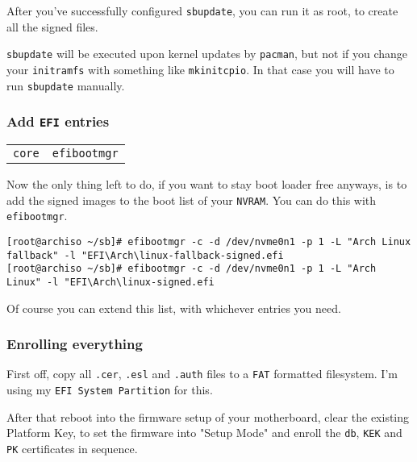 \documentclass[9pt]{report}
\newenvironment{NOTE}
{\begin{tcolorbox}[colback=admonitionBG,coltitle=draculaFG,colframe=draculaBlue,colbacktitle=draculaBlue,title=NOTE]}
{\end{tcolorbox}}
\newenvironment{packagetable}
{\begin{longtabu}to \textwidth [b]{X[1,r]|X[1,l]}}
{\end{longtabu}}
\begin{document}
After you’ve successfully configured \texttt{sbupdate}, you can run it as root, to create all the signed files.


\begin{NOTE}
    \texttt{sbupdate} will be executed upon kernel updates by \texttt{pacman}, but not if you change your \texttt{initramfs} with something like \texttt{mkinitcpio}.
    In that case you will have to run \texttt{sbupdate} manually.

\end{NOTE}

\newpage

\hypertarget{x-add-efi-entries}{\subsubsection{Add \texttt{EFI} entries}}
\begin{packagetable}
    \texttt{core} & \texttt{efibootmgr} \\ 
\end{packagetable}

Now the only thing left to do, if you want to stay boot loader free anyways, is to add the signed images to the boot list of your \texttt{NVRAM}.
You can do this with \texttt{efibootmgr}.


\begin{verbatim}
[root@archiso ~/sb]# efibootmgr -c -d /dev/nvme0n1 -p 1 -L "Arch Linux fallback" -l "EFI\Arch\linux-fallback-signed.efi
[root@archiso ~/sb]# efibootmgr -c -d /dev/nvme0n1 -p 1 -L "Arch Linux" -l "EFI\Arch\linux-signed.efi
\end{verbatim}

Of course you can extend this list, with whichever entries you need.



\newpage

\hypertarget{x-enrolling-everything}{\subsubsection{Enrolling everything}}
First off, copy all \texttt{.cer}, \texttt{.esl} and \texttt{.auth} files to a \texttt{FAT} formatted filesystem.
I’m using my \texttt{EFI System Partition} for this.


After that reboot into the firmware setup of your motherboard, clear the existing Platform Key, to set the firmware into "Setup Mode" and enroll the \texttt{db}, \texttt{KEK} and \texttt{PK} certificates in sequence.
\end{document}
